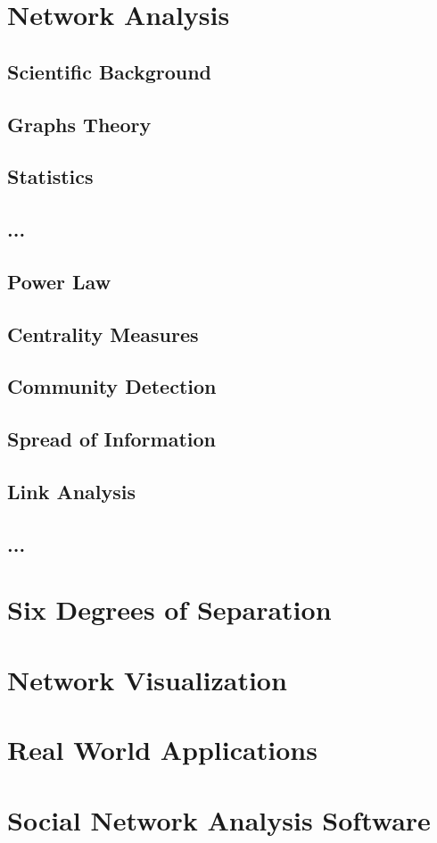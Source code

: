 \section{Network Analysis}
\subsection{Scientific Background}
\subsection{Graphs Theory}
\subsection{Statistics}
\subsection{...}
\subsection{Power Law}
\subsection{Centrality Measures}
\subsection{Community Detection}
\subsection{Spread of Information}
\subsection{Link Analysis}
\subsection{...}
\section{Six Degrees of Separation}

\section{Network Visualization}

\section{Real World Applications}

\section{Social Network Analysis Software}
